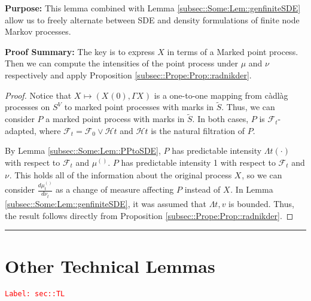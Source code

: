 \documentclass[12pt]{article}
\newcommand{\mc}{\mathcal}
\newcommand{\tr}{\textcolor{red}}
\newcommand{\labe}[1]{\tr{\texttt{Label: #1}}}
\newcommand{\purpose}{\textbf{Purpose: }}
\newcommand{\pfsum}{\textbf{Proof Summary: }}
\newcommand{\ind}{\hspace{24pt}}
\newcommand{\lin}{\rule{\linewidth}{0.4 pt}}
\renewcommand{\v}{v}							%
\renewcommand{\S}{S}							%
\renewcommand{\t}{t}							%
\newcommand{\F}{\mc{F}}							%
\newcommand{\FH}{\mc{H}}						%
\newcommand{\X}{X}								%
\newcommand{\vind}[1]{^{#1}}					%
\newcommand{\carp}[1]{^{#1}}					%
\newcommand{\vsi}[1]{^{#1}}						%
\newcommand{\cind}[1]{_{#1}}					%
\newcommand{\tp}[1]{(#1)}						%
\newcommand{\tip}[1]{#1}						%
\newcommand{\ts}[1]{_{#1}}						%
\newcommand{\sln}[1]{^{(#1)}}					%
\newcommand{\alt}[1]{\widetilde{#1}}			%
\newcommand{\m}{\mu}							%
\newcommand{\mm}{\nu}							%
\newcommand{\pmap}{\Gamma}						%
\newcommand{\rp}{P}								%
\newcommand{\ratee}{\Lambda}					%
\begin{document}
\purpose This lemma combined with Lemma \ref{subsec::Some:Lem::genfiniteSDE} allow us to freely alternate between SDE and density formulations of finite node Markov processes.

\pfsum The key is to express \(\X\) in terms of a Marked point process. Then we can compute the intensities of the point process under \(\m\) and \(\mm\) respectively and apply Proposition \ref{subsec::Prope:Prop::radnikder}.

\begin{proof}
Notice that \(\X\cind{}\tip{} \mapsto (\X\cind{}\tp{0},\pmap{\X\cind{}\tip{}})\) is a one-to-one mapping from c\`adl\`ag processes on \(\S\carp{V}\) to marked point processes with marks in \(\alt{\S}\). Thus, we can consider \(\rp{}\) a marked point process with marks in \(\alt{\S}\). In both cases, \(\rp{}\) is \(\F\vsi{}\ts{\t}\)-adapted, where \(\F\vsi{}\ts{\t} = \F\vsi{}\ts{0}\vee \FH{}{\t}\) and \(\FH{}{\t}\) is the natural filtration of \(\rp{}\).

\ind By Lemma \ref{subsec::Some:Lem::PPtoSDE}, \(\rp{}\) has predictable intensity \(\ratee{\t}(\cdot)\) with respect to \(\F\vsi{}\ts{\t}\) and \(\m\sln{}\ts{}\). \(\rp{}\) has predictable intensity 1 with respect to \(\F\vsi{}\ts{\t}\) and \(\mm\vind{}\ts{}\). This holds all of the information about the original process \(\X\cind{}\tip{}\), so we can consider \(\frac{d\m\sln{}\ts{\t}}{d\mm\vind{}\ts{\t}}\) as a change of measure affecting \(\rp{}\) instead of \(\X\cind{}\tip{}\). In Lemma \ref{subsec::Some:Lem::genfiniteSDE}, it was assumed that \(\ratee{\t,\v}\) is bounded. Thus, the result follows directly from Proposition \ref{subsec::Prope:Prop::radnikder}. 
\end{proof}

\lin
\section{Other Technical Lemmas}
\label{sec::TL}\labe{sec::TL}
\end{document}
